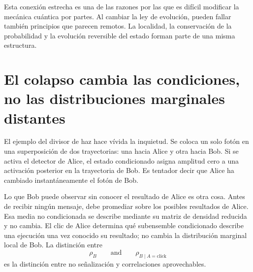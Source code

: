 Esta conexión estrecha es una de las razones por las que es difícil modificar la mecánica cuántica por partes. Al cambiar la ley de evolución, pueden fallar también principios que parecen remotos. La localidad, la conservación de la probabilidad y la evolución reversible del estado forman parte de una misma estructura.

\begin{classroomqa}
\end{classroomqa}

\section{El colapso cambia las condiciones, no las distribuciones marginales distantes}

El ejemplo del divisor de haz hace vívida la inquietud. Se coloca un solo fotón en una superposición de dos trayectorias: una hacia Alice y otra hacia Bob. Si se activa el detector de Alice, el estado condicionado asigna amplitud cero a una activación posterior en la trayectoria de Bob. Es tentador decir que Alice ha cambiado instantáneamente el fotón de Bob.

Lo que Bob puede observar sin conocer el resultado de Alice es otra cosa. Antes de recibir ningún mensaje, debe promediar sobre los posibles resultados de Alice. Esa media no condicionada se describe mediante su matriz de densidad reducida y no cambia. El clic de Alice determina qué subensemble condicionado describe una ejecución una vez conocido su resultado; no cambia la distribución marginal local de Bob. La distinción entre
\begin{equation}
\rho_B
\qquad\text{and}\qquad
\rho_{B\mid A=\text{click}}
\end{equation}
es la distinción entre no señalización y correlaciones aprovechables.

\begin{classroomqa}
\end{classroomqa}

